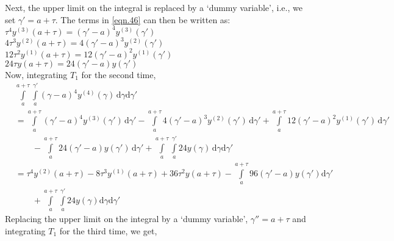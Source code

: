 \documentclass{article}
\begin{document}
Next, the upper limit on the integral is replaced by a \lq dummy variable\rq, i.e., we set $\gamma'=a+\tau$. The terms in \eqref{eqn.46} can then be written as:\vspace{\baselineskip}\\
$\tau^4 y^{(3)}(a+\tau) = (\gamma'-a)^4 y^{(3)}(\gamma')$\\
$4\tau^3 y^{(2)}(a+\tau) = 4(\gamma'-a)^3 y^{(2)}(\gamma')$\\
$12\tau^2 y^{(1)}(a+\tau) = 12(\gamma'-a)^2 y^{(1)}(\gamma')$\\
$24\tau y(a+\tau) = 24(\gamma'-a) y(\gamma')$\\
Now, integrating $T_1$ for the second time,
\begin{equation}\label{eqn.47}
\begin{split}
&\int\limits_{a}^{a+\tau}\int\limits_{a}^{\gamma'} (\gamma-a)^4 y^{(4)}(\gamma)\, \mathrm{d}\gamma \mathrm{d}\gamma'\\ 
& = \int\limits_{a}^{a+\tau}(\gamma'-a)^4 y^{(3)}(\gamma')\, \mathrm{d}  \gamma'- \int\limits_{a}^{a+\tau}4(\gamma'-a)^3 y^{(2)}(\gamma')\, \mathrm{d}\gamma' + \int\limits_{a}^{a+\tau} 12(\gamma'-a)^{2} y^{(1)}(\gamma')\, \mathrm{d}\gamma'\\
&\qquad{} - \int\limits_{a}^{a+\tau} 24(\gamma'-a) y(\gamma')\, \mathrm{d}\gamma' + \int\limits_{a}^{a+\tau}\int\limits_{a}^{\gamma'} 24 y(\gamma)\, \mathrm{d}\gamma \mathrm{d}\gamma'\\
& = \tau^{4}y^{(2)}(a+\tau) - 8\tau^{3}y^{(1)}(a+\tau) + 36\tau^{2}y(a+\tau) - \int\limits_{a}^{a+\tau}96(\gamma'-a)y(\gamma')\mathrm{d}\gamma'\\
&\qquad{} + \int\limits_{a}^{a+\tau}\int\limits_{a}^{\gamma'}24y(\gamma)\mathrm{d}\gamma\mathrm{d}\gamma' 
\end{split}
\end{equation}
Replacing the upper limit on the integral by a \lq dummy variable\rq, $\gamma''=a+\tau$ and integrating $T_1$ for the third time, we get,\\
\end{document}
